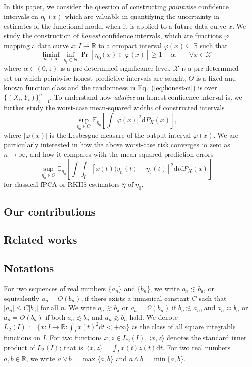 \documentclass[11pt,a4paper]{article}
\renewcommand{\hat}{\widehat}
\theoremstyle{definition}
\theoremstyle{plain}
\theoremstyle{remark}
\newcommand{\ud}{\mathrm d}
\begin{document}
In this paper, we consider the question of constructing \emph{pointwise} confidence intervals on $\eta_0(x)$ which are valuable in quantifying the uncertainty in estimates of the functional model
when it is applied to a future data curve $x$. We study the construction of \emph{honest} confidence intervals, which are functions $\varphi$ mapping a data curve $x:I\to\mathbb R$ to a compact interval $\varphi(x)\subseteq\mathbb R$
such that
\begin{equation}
\liminf_{n\to\infty}\inf_{\eta_0\in\Theta} \Pr\left[\eta_0(x)\in\varphi(x)\right] \geq 1-\alpha,\;\;\;\;\;\;\forall x\in\mathcal X
\label{eq:honest-ci}
\end{equation}
where $\alpha\in(0,1)$ is a pre-determined significance level,
$\mathcal X$ is a pre-determined set on which pointwise honest predictive intervals are saught, $\Theta$ is a fixed and known function class and the randomness in Eq.~(\ref{eq:honest-ci}) is over $\{(X_i,Y_i)\}_{i=1}^n$.
To understand how \emph{adative} an honest confidence interval is, we further study the worst-case mean-squared widths of constructed intervals
\begin{equation}
\sup_{\eta_0\in\Theta}\mathbb E_{\eta_0} \left[\int\big|\varphi(x)\big|^2\ud P_X(x)\right],
\label{eq:adaptive}
\end{equation}
where $|\varphi(x)|$ is the Lesbesgue measure of the output interval $\varphi(x)$. We are particularly interested in how the above worst-case risk converges to zero as $n\to\infty$,
and how it compares with the mean-squared prediction errors
$$
\sup_{\eta_0\in\Theta}\mathbb E_{\eta_0} \left[\int\int_I [x(t)(\hat\eta_n(t)-\eta_0(t)]^2\ud t\ud P_X(x)\right]
$$
for classical fPCA or RKHS estimators $\hat\eta$ of $\eta_0$.

\subsection{Our contributions}

\subsection{Related works}

\subsection{Notations}

For two sequences of real numbers $\{a_n\}$ and $\{b_n\}$, we write $a_n\lesssim b_n$, or equivalently $a_n=O(b_n)$, if there exists a numerical constant $C$ such that $|a_n|\leq C|b_n|$ for all $n$.
We write $a_n\gtrsim b_n$ or $a_n=\Omega(b_n)$ if $b_n\lesssim a_n$, and $a_n\asymp b_n$ or $a_n=\Theta(b_n)$ if both $a_n\lesssim b_n$ and $a_n\gtrsim b_n$ hold.
We denote $L_2(I):=\{x: I\to\mathbb R: \int_I x(t)^2\ud t<+\infty\}$ as the class of all square integrable functions on $I$.
For two functions $x,z\in L_2(I)$, $\langle x,z\rangle$ denotes the standard inner product of $L_2(I)$; that is, $\langle x,z\rangle = \int_I x(t)z(t)\ud t$.
For two real numbers $a,b\in\mathbb R$, we write $a\vee b=\max\{a,b\}$ and $a\wedge b=\min\{a,b\}$.
\end{document}
